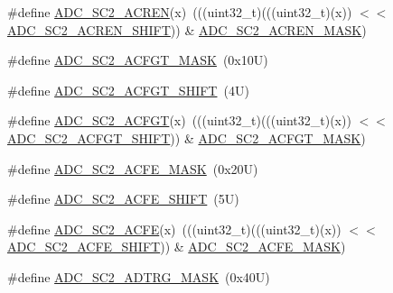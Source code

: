 \begin{DoxyCompactItemize}
\item 
\#define \mbox{\hyperlink{group___a_d_c___register___masks_gad7fb3f932510bfc9289e81b533ab0e3c}{A\+D\+C\+\_\+\+S\+C2\+\_\+\+A\+C\+R\+EN}}(x)~(((uint32\+\_\+t)(((uint32\+\_\+t)(x)) $<$$<$ \mbox{\hyperlink{group___a_d_c___register___masks_ga34954b7e5cb86e290b281e2f97b63187}{A\+D\+C\+\_\+\+S\+C2\+\_\+\+A\+C\+R\+E\+N\+\_\+\+S\+H\+I\+FT}})) \& \mbox{\hyperlink{group___a_d_c___register___masks_ga25f7f0c6a6513cbfbd4684513b373f9c}{A\+D\+C\+\_\+\+S\+C2\+\_\+\+A\+C\+R\+E\+N\+\_\+\+M\+A\+SK}})
\item 
\#define \mbox{\hyperlink{group___a_d_c___register___masks_gaf61a6fdf74bec8c24415e590dc98b572}{A\+D\+C\+\_\+\+S\+C2\+\_\+\+A\+C\+F\+G\+T\+\_\+\+M\+A\+SK}}~(0x10\+U)
\item 
\#define \mbox{\hyperlink{group___a_d_c___register___masks_gaa27da559ff9959f248db75fbb95dae6b}{A\+D\+C\+\_\+\+S\+C2\+\_\+\+A\+C\+F\+G\+T\+\_\+\+S\+H\+I\+FT}}~(4\+U)
\item 
\#define \mbox{\hyperlink{group___a_d_c___register___masks_ga9c0a129086504b0b4a517d9ac2c48690}{A\+D\+C\+\_\+\+S\+C2\+\_\+\+A\+C\+F\+GT}}(x)~(((uint32\+\_\+t)(((uint32\+\_\+t)(x)) $<$$<$ \mbox{\hyperlink{group___a_d_c___register___masks_gaa27da559ff9959f248db75fbb95dae6b}{A\+D\+C\+\_\+\+S\+C2\+\_\+\+A\+C\+F\+G\+T\+\_\+\+S\+H\+I\+FT}})) \& \mbox{\hyperlink{group___a_d_c___register___masks_gaf61a6fdf74bec8c24415e590dc98b572}{A\+D\+C\+\_\+\+S\+C2\+\_\+\+A\+C\+F\+G\+T\+\_\+\+M\+A\+SK}})
\item 
\#define \mbox{\hyperlink{group___a_d_c___register___masks_gace8c45960f30bb960fd14d268b7eafde}{A\+D\+C\+\_\+\+S\+C2\+\_\+\+A\+C\+F\+E\+\_\+\+M\+A\+SK}}~(0x20\+U)
\item 
\#define \mbox{\hyperlink{group___a_d_c___register___masks_ga195dec335492d561b06a4cc443bae019}{A\+D\+C\+\_\+\+S\+C2\+\_\+\+A\+C\+F\+E\+\_\+\+S\+H\+I\+FT}}~(5\+U)
\item 
\#define \mbox{\hyperlink{group___a_d_c___register___masks_gaa7694354f2e8d79359a86e4facdc1996}{A\+D\+C\+\_\+\+S\+C2\+\_\+\+A\+C\+FE}}(x)~(((uint32\+\_\+t)(((uint32\+\_\+t)(x)) $<$$<$ \mbox{\hyperlink{group___a_d_c___register___masks_ga195dec335492d561b06a4cc443bae019}{A\+D\+C\+\_\+\+S\+C2\+\_\+\+A\+C\+F\+E\+\_\+\+S\+H\+I\+FT}})) \& \mbox{\hyperlink{group___a_d_c___register___masks_gace8c45960f30bb960fd14d268b7eafde}{A\+D\+C\+\_\+\+S\+C2\+\_\+\+A\+C\+F\+E\+\_\+\+M\+A\+SK}})
\item 
\#define \mbox{\hyperlink{group___a_d_c___register___masks_ga25669c020c8970b55cd619752bdc84d2}{A\+D\+C\+\_\+\+S\+C2\+\_\+\+A\+D\+T\+R\+G\+\_\+\+M\+A\+SK}}~(0x40\+U)
$$
\end{DoxyCompactItemize}
